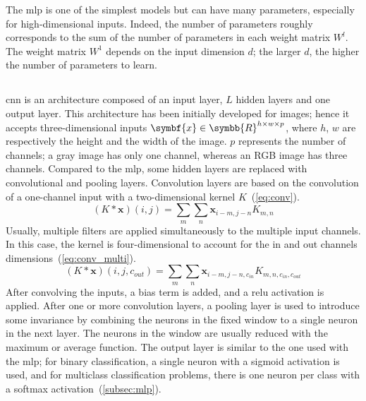\documentclass[../main.tex]{subfiles}
\begin{document}
	 The \gls{mlp} is one of the simplest models but can have many parameters, especially for high-dimensional inputs.
	 Indeed, the number of parameters roughly corresponds to the sum of the number of parameters in each weight matrix \(W^{l}\).
	 The weight matrix \(W^1\) depends on the input dimension \(d\); the larger \(d\), the higher the number of parameters to learn.

 \subsection{}
	 \Gls{cnn} is an architecture composed of an input layer, \(L\) hidden layers and one output layer.
	 This architecture has been initially developed for images; hence it accepts three-dimensional inputs \(\symbf{x} \in \symbb{R}^{h\times w \times p} \), where \(h\), \(w\) are respectively the height and the width of the image.
	 \(p\) represents the number of channels; a gray image has only one channel, whereas an RGB image has three channels.
	 Compared to the \gls{mlp}, some hidden layers are replaced with convolutional and pooling layers.
	 Convolution layers are based on the convolution of a one-channel input with a two-dimensional kernel \(K\)~(\cref{eq:conv}).
	 \begin{equation}
		 \left(K * \symbf{x}\right)\left(i,j\right) =\sum_m\sum_n \symbf{x}_{i-m, j-n}K_{m,n} \label{eq:conv}
	 \end{equation}
	 Usually, multiple filters are applied simultaneously to the multiple input channels.
	 In this case, the kernel is four-dimensional to account for the in and out channels dimensions~(\cref{eq:conv_multi}).
	 \begin{equation}
		 \left(K * \symbf{x}\right)\left(i,j, c_{out}\right) =\sum_m\sum_n \symbf{x}_{i-m, j-n, c_{in}}K_{m,n, c_{in}, c_{out}} \label{eq:conv_multi}
	 \end{equation}
	 After convolving the inputs, a bias term is added, and a \gls{relu} activation is applied.
	 After one or more convolution layers, a pooling layer is used to introduce some invariance by combining the neurons in the fixed window to a single neuron in the next layer.
	 The neurons in the window are usually reduced with the maximum or average function.
	 The output layer is similar to the one used with the \gls{mlp}; for binary classification, a single neuron with a sigmoid activation is used, and for multiclass classification problems, there is one neuron per class with a softmax activation~(\cref{subsec:mlp}).
\end{document}
